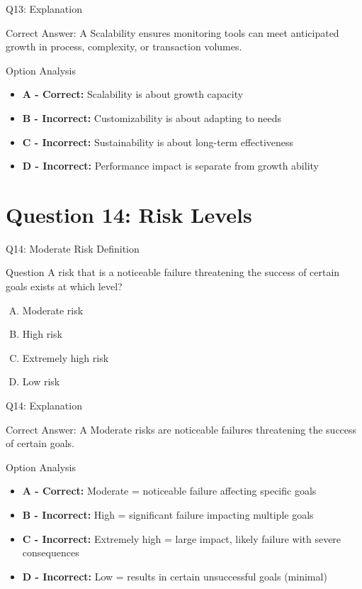 \documentclass{beamer}
\begin{document}
	\begin{frame}{Q13: Explanation}
		\begin{block}{Correct Answer: A}
			Scalability ensures monitoring tools can meet anticipated growth in process, complexity, or transaction volumes.
		\end{block}
		\begin{block}{Option Analysis}
			\begin{itemize}
				\item \textbf{A - Correct:} Scalability is about growth capacity
				\item \textbf{B - Incorrect:} Customizability is about adapting to needs
				\item \textbf{C - Incorrect:} Sustainability is about long-term effectiveness
				\item \textbf{D - Incorrect:} Performance impact is separate from growth ability
			\end{itemize}
		\end{block}
	\end{frame}
	
	\section{Question 14: Risk Levels}
	
	\begin{frame}{Q14: Moderate Risk Definition}
		\begin{block}{Question}
			A risk that is a noticeable failure threatening the success of certain goals exists at which level?
		\end{block}
		\begin{enumerate}[(A)]
			\item Moderate risk
			\item High risk
			\item Extremely high risk
			\item Low risk
		\end{enumerate}
	\end{frame}
	
	\begin{frame}{Q14: Explanation}
		\begin{block}{Correct Answer: A}
			Moderate risks are noticeable failures threatening the success of certain goals.
		\end{block}
		\begin{block}{Option Analysis}
			\begin{itemize}
				\item \textbf{A - Correct:} Moderate = noticeable failure affecting specific goals
				\item \textbf{B - Incorrect:} High = significant failure impacting multiple goals
				\item \textbf{C - Incorrect:} Extremely high = large impact, likely failure with severe consequences
				\item \textbf{D - Incorrect:} Low = results in certain unsuccessful goals (minimal)
			\end{itemize}
		\end{block}
	\end{frame}
	
\end{document}
